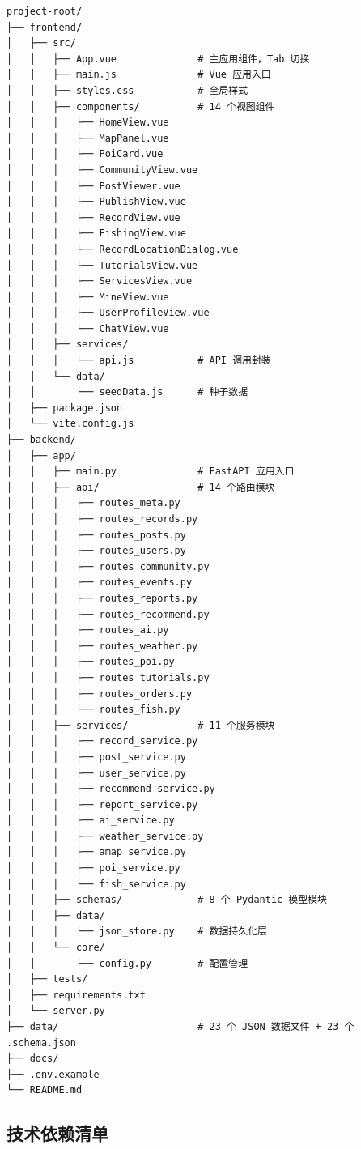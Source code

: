 \documentclass[12pt,a4paper]{ctexart}
\begin{document}
\begin{lstlisting}[caption={项目根目录结构},label={lst:project-structure}]
project-root/
├── frontend/
│   ├── src/
│   │   ├── App.vue              # 主应用组件，Tab 切换
│   │   ├── main.js              # Vue 应用入口
│   │   ├── styles.css           # 全局样式
│   │   ├── components/          # 14 个视图组件
│   │   │   ├── HomeView.vue
│   │   │   ├── MapPanel.vue
│   │   │   ├── PoiCard.vue
│   │   │   ├── CommunityView.vue
│   │   │   ├── PostViewer.vue
│   │   │   ├── PublishView.vue
│   │   │   ├── RecordView.vue
│   │   │   ├── FishingView.vue
│   │   │   ├── RecordLocationDialog.vue
│   │   │   ├── TutorialsView.vue
│   │   │   ├── ServicesView.vue
│   │   │   ├── MineView.vue
│   │   │   ├── UserProfileView.vue
│   │   │   └── ChatView.vue
│   │   ├── services/
│   │   │   └── api.js           # API 调用封装
│   │   └── data/
│   │       └── seedData.js      # 种子数据
│   ├── package.json
│   └── vite.config.js
├── backend/
│   ├── app/
│   │   ├── main.py              # FastAPI 应用入口
│   │   ├── api/                 # 14 个路由模块
│   │   │   ├── routes_meta.py
│   │   │   ├── routes_records.py
│   │   │   ├── routes_posts.py
│   │   │   ├── routes_users.py
│   │   │   ├── routes_community.py
│   │   │   ├── routes_events.py
│   │   │   ├── routes_reports.py
│   │   │   ├── routes_recommend.py
│   │   │   ├── routes_ai.py
│   │   │   ├── routes_weather.py
│   │   │   ├── routes_poi.py
│   │   │   ├── routes_tutorials.py
│   │   │   ├── routes_orders.py
│   │   │   └── routes_fish.py
│   │   ├── services/            # 11 个服务模块
│   │   │   ├── record_service.py
│   │   │   ├── post_service.py
│   │   │   ├── user_service.py
│   │   │   ├── recommend_service.py
│   │   │   ├── report_service.py
│   │   │   ├── ai_service.py
│   │   │   ├── weather_service.py
│   │   │   ├── amap_service.py
│   │   │   ├── poi_service.py
│   │   │   └── fish_service.py
│   │   ├── schemas/             # 8 个 Pydantic 模型模块
│   │   ├── data/
│   │   │   └── json_store.py    # 数据持久化层
│   │   └── core/
│   │       └── config.py        # 配置管理
│   ├── tests/
│   ├── requirements.txt
│   └── server.py
├── data/                        # 23 个 JSON 数据文件 + 23 个 .schema.json
├── docs/
├── .env.example
└── README.md
\end{lstlisting}

\subsection{技术依赖清单}
\end{document}
